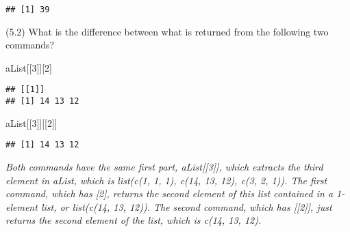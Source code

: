 \documentclass[
]{article}
\newenvironment{Shaded}{\begin{snugshade}}{\end{snugshade}}
\newcommand{\DecValTok}[1]{\textcolor[rgb]{0.00,0.00,0.81}{#1}}
\newcommand{\NormalTok}[1]{#1}
\begin{document}
\begin{verbatim}
## [1] 39
\end{verbatim}

(5.2) What is the difference between what is returned from the following
two commands?

\begin{Shaded}
\begin{Highlighting}[]
\NormalTok{aList[[}\DecValTok{3}\NormalTok{]][}\DecValTok{2}\NormalTok{]}
\end{Highlighting}
\end{Shaded}

\begin{verbatim}
## [[1]]
## [1] 14 13 12
\end{verbatim}

\begin{Shaded}
\begin{Highlighting}[]
\NormalTok{aList[[}\DecValTok{3}\NormalTok{]][[}\DecValTok{2}\NormalTok{]]}
\end{Highlighting}
\end{Shaded}

\begin{verbatim}
## [1] 14 13 12
\end{verbatim}

\emph{Both commands have the same first part, aList{[}{[}3{]}{]}, which
extracts the third element in aList, which is list(c(1, 1, 1), c(14, 13,
12), c(3, 2, 1)). The first command, which has {[}2{]}, returns the
second element of this list contained in a 1-element list, or list(c(14,
13, 12)). The second command, which has {[}{[}2{]}{]}, just returns the
second element of the list, which is c(14, 13, 12).}

~\\
\strut ~ ~ ~
\end{document}
